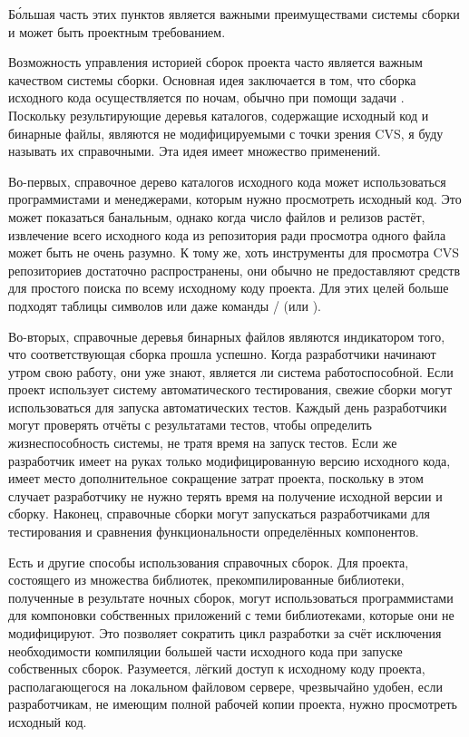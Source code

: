 Б\'{о}льшая часть этих пунктов является важными преимуществами системы
сборки и может быть проектным требованием.

Возможность управления историей сборок проекта часто является важным
качеством системы сборки. Основная идея заключается в том, что сборка
исходного кода осуществляется по ночам, обычно при помощи задачи
.
Поскольку результирующие деревья каталогов, содержащие
исходный код и бинарные файлы, являются не модифицируемыми с точки
зрения CVS, я буду называть их справочными. Эта идея имеет множество
применений.

Во-первых, справочное дерево каталогов исходного кода может
использоваться программистами и менеджерами, которым нужно просмотреть
исходный код. Это может показаться банальным, однако когда число
файлов и релизов растёт, извлечение всего исходного кода из
репозитория ради просмотра одного файла может быть не очень разумно. К
тому же, хоть инструменты для просмотра CVS репозиториев достаточно
распространены, они обычно не предоставляют средств для простого
поиска по всему исходному коду проекта. Для этих целей больше подходят
таблицы символов или даже команды / (или
).

Во-вторых, справочные деревья бинарных файлов являются индикатором
того, что соответствующая сборка прошла успешно. Когда разработчики
начинают утром свою работу, они уже знают, является ли система
работоспособной. Если проект использует систему автоматического
тестирования, свежие сборки могут использоваться для запуска
автоматических тестов. Каждый день разработчики могут проверять отчёты
с результатами тестов, чтобы определить жизнеспособность системы, не
тратя время на запуск тестов. Если же разработчик имеет на руках
только модифицированную версию исходного кода, имеет место дополнительное
сокращение затрат проекта, поскольку в этом случает разработчику не
нужно терять время на получение исходной версии и сборку. Наконец,
справочные сборки могут запускаться разработчиками для тестирования и
сравнения функциональности определённых компонентов.

Есть и другие способы использования справочных сборок. Для проекта,
состоящего из множества библиотек, прекомпилированные библиотеки,
полученные в результате ночных сборок, могут использоваться
программистами для компоновки собственных приложений с теми
библиотеками, которые они не модифицируют. Это позволяет сократить
цикл разработки за счёт исключения необходимости компиляции большей
части исходного кода при запуске собственных сборок. Разумеется,
лёгкий доступ к исходному коду проекта, располагающегося на локальном
файловом сервере, чрезвычайно удобен, если разработчикам, не имеющим
полной рабочей копии проекта, нужно просмотреть исходный код.

